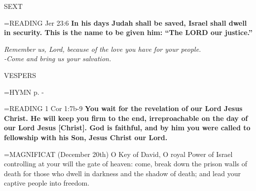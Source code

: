 \begin{flushleft}\normalsize SEXT\\\end{flushleft}

\hangindent=\parindent \small{\uppercase{READING}} Jer 23:6 \textbf{In his days Judah shall be saved, Israel shall dwell in security. This is the name to be given him: “The LORD our justice.”\\}

\begin{center}
\textit{Remember us, Lord, because of the love you have for your people.\\
-Come and bring us your salvation.}
\end{center}

\begin{flushleft}\normalsize VESPERS\\\end{flushleft}

\hangindent=\parindent \small{\uppercase{HYMN} p. \pageref{advent:firstHymn}-\pageref{advent:lastHymn}\\}

\hangindent=\parindent \small{\uppercase{READING}} 1 Cor 1:7b-9 \textbf{You wait for the revelation of our Lord Jesus Christ. He will keep you firm to the end, irreproachable on the day of our Lord Jesus [Christ]. God is faithful, and by him you were called to fellowship with his Son, Jesus Christ our Lord.\\}

\hangindent=\parindent \small{MAGNIFICAT  (December 20th) O Key of David, O royal Power of Israel controlling at your will the gate of heaven: come, break down the prison walls of death for those who dwell in darkness and the shadow of death; and lead your captive people into freedom.\\}
